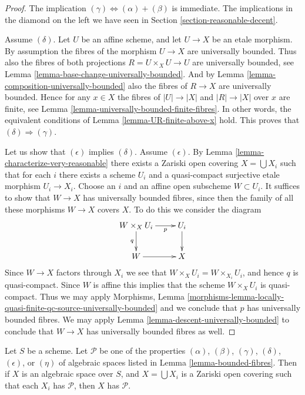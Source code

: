 \begin{proof}
The implication $(\gamma) \Leftrightarrow (\alpha) + (\beta)$ is immediate.
The implications in the diamond on the left we have seen in
Section \ref{section-reasonable-decent}.

\medskip\noindent
Assume $(\delta)$. Let $U$ be an affine scheme, and let $U \to X$ be an etale
morphism. By assumption the fibres of the morphism $U \to X$ are universally
bounded. Thus also the fibres of both projections $R = U \times_X U \to U$
are universally bounded, see
Lemma \ref{lemma-base-change-universally-bounded}.
And by Lemma \ref{lemma-composition-universally-bounded} also
the fibres of $R \to X$ are universally bounded.
Hence for any $x \in X$ the fibres of $|U| \to |X|$ and $|R| \to |X|$
over $x$ are finite, see Lemma \ref{lemma-universally-bounded-finite-fibres}.
In other words, the equivalent conditions of
Lemma \ref{lemma-UR-finite-above-x}
hold. This proves that $(\delta) \Rightarrow (\gamma)$.

\medskip\noindent
Let us show that $(\epsilon)$ implies $(\delta)$.
Assume $(\epsilon)$. By
Lemma \ref{lemma-characterize-very-reasonable}
there exists
a Zariski open covering $X = \bigcup X_i$ such that for each $i$
there exists a scheme $U_i$ and a quasi-compact surjective etale morphism
$U_i \to X_i$. Choose an $i$ and an affine open subscheme $W \subset U_i$.
It suffices to show that $W \to X$ has universally bounded fibres, since then
the family of all these morphisms $W \to X$ covers $X$.
To do this we consider the diagram
$$
\xymatrix{
W \times_X U_i \ar[r]_-p \ar[d]_q & U_i \ar[d] \\
W \ar[r] & X
}
$$
Since $W \to X$ factors through $X_i$ we see that
$W \times_X U_i = W \times_{X_i} U_i$, and hence $q$ is quasi-compact.
Since $W$ is affine this implies that the scheme $W \times_X U_i$
is quasi-compact. Thus we may apply
Morphisms, Lemma
\ref{morphisms-lemma-locally-quasi-finite-qc-source-universally-bounded}
and we conclude that $p$ has universally bounded fibres.
We may apply
Lemma \ref{lemma-descent-universally-bounded}
to conclude that $W \to X$ has universally bounded fibres as well.
\end{proof}

\begin{lemma}
\label{lemma-properties-local}
Let $S$ be a scheme.
Let $\mathcal{P}$ be one of the properties
$(\alpha)$, $(\beta)$, $(\gamma)$, $(\delta)$, $(\epsilon)$, or
$(\eta)$ of algebraic spaces
listed in Lemma \ref{lemma-bounded-fibres}.
Then if $X$ is an algebraic space over $S$, and $X = \bigcup X_i$ is a
Zariski open covering such that each $X_i$ has $\mathcal{P}$,
then $X$ has $\mathcal{P}$.
\end{lemma}

